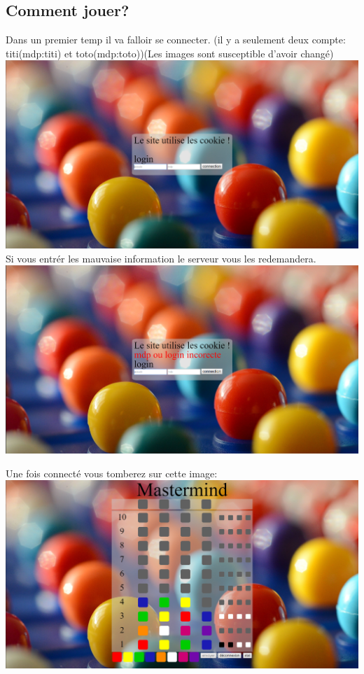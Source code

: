 \documentclass{article}
\begin{document}
    \subsection{Comment jouer?}
        Dans un premier temp il va falloir se connecter. (il y a seulement deux compte: titi(mdp:titi) et toto(mdp:toto))(Les images sont susceptible d'avoir changé)\\
        \includegraphics[width=\linewidth]{log}\\
        
        Si vous entrér les mauvaise information le serveur vous les redemandera.\\
        \includegraphics[width=\linewidth]{logFail}\\
        
\clearpage

        Une fois connecté vous tomberez sur cette image:\\
        \includegraphics[width=\linewidth]{ingame}\\
\end{document}
